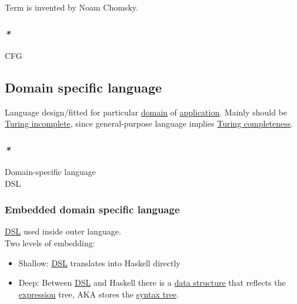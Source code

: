 \documentclass[11pt]{article}
\begin{document}
Term is invented by Noam Chomsky.\\

\subsubsection{\emph{*}}
\label{sec:orgcc35529}

\label{org18f9da7}CFG\\

\subsection{\label{orgdb76bfd}Domain specific language}
\label{sec:org8f87355}
Language design/fitted for particular \hyperref[orgf784585]{domain} of \hyperref[orged2f814]{application}. Mainly should be \hyperref[org26fe428]{Turing incomplete}, since general-purpose language implies \hyperref[org41243f8]{Turing completeness}.\\

\subsubsection{\emph{*}}
\label{sec:org293220d}

\label{org905b1fe}Domain-specific language\\
\label{org73e1a90}DSL\\

\subsubsection{\label{orgfcfd394}Embedded domain specific language}
\label{sec:orgff5097f}

\hyperref[org73e1a90]{DSL} used inside outer language.\\

Two levels of embedding:\\

\begin{itemize}
\item Shallow: \hyperref[org73e1a90]{DSL} translates into Haskell directly\\
\item Deep: Between \hyperref[org73e1a90]{DSL} and Haskell there is a \hyperref[org47669ca]{data structure} that reflects the \hyperref[org667db83]{expression} tree, AKA stores the \hyperref[org66b5ad6]{syntax tree}.\\
\end{itemize}
\end{document}
